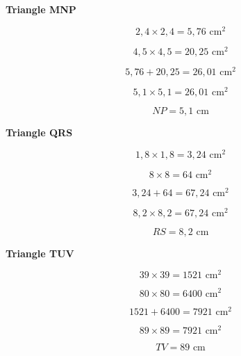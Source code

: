 \documentclass[11pt,a4paper,landscape]{article}
\begin{document}
\noindent
\begin{minipage}[t]{0.235\textwidth}

\begin{tcolorbox}[
  colback=white,
  colframe=SavoirC!50,
  boxrule=0.6pt,
  arc=1.5mm,
  height=7cm
]

\begin{center}
{\sffamily\bfseries\color{SavoirC}Triangle MNP}
\end{center}

\[
2{,}4\times2{,}4=5{,}76\text{ cm}^2
\]

\[
4{,}5\times4{,}5=20{,}25\text{ cm}^2
\]

\[
5{,}76+20{,}25=26{,}01\text{ cm}^2
\]

\[
5{,}1\times5{,}1=26{,}01\text{ cm}^2
\]

\[
\boxed{NP=5{,}1\text{ cm}}
\]

\end{tcolorbox}

\end{minipage}
\hfill
%
\begin{minipage}[t]{0.235\textwidth}

\begin{tcolorbox}[
  colback=white,
  colframe=SavoirC!50,
  boxrule=0.6pt,
  arc=1.5mm,
  height=7cm
]

\begin{center}
{\sffamily\bfseries\color{SavoirC}Triangle QRS}
\end{center}

\[
1{,}8\times1{,}8=3{,}24\text{ cm}^2
\]

\[
8\times8=64\text{ cm}^2
\]

\[
3{,}24+64=67{,}24\text{ cm}^2
\]

\[
8{,}2\times8{,}2=67{,}24\text{ cm}^2
\]

\[
\boxed{RS=8{,}2\text{ cm}}
\]

\end{tcolorbox}

\end{minipage}
\hfill
%
\begin{minipage}[t]{0.235\textwidth}

\begin{tcolorbox}[
  colback=white,
  colframe=SavoirC!50,
  boxrule=0.6pt,
  arc=1.5mm,
  height=7cm
]

\begin{center}
{\sffamily\bfseries\color{SavoirC}Triangle TUV}
\end{center}

\[
39\times39=1521\text{ cm}^2
\]

\[
80\times80=6400\text{ cm}^2
\]

\[
1521+6400=7921\text{ cm}^2
\]

\[
89\times89=7921\text{ cm}^2
\]

\[
\boxed{TV=89\text{ cm}}
\]

\end{tcolorbox}

\end{minipage}
\end{document}
